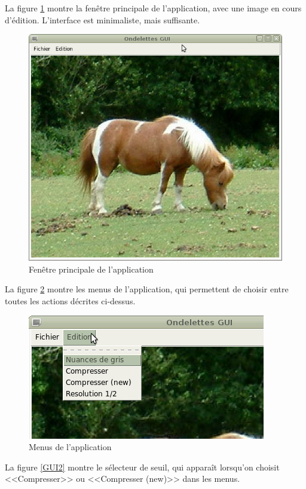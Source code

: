 \documentclass{article}
\begin{document}
La figure \ref{GUI} montre la fenêtre principale de l'application, avec une image en cours d'édition. L'interface est minimaliste, mais suffisante.


\begin{figure}[!hb]
\centering
\includegraphics[scale=0.5]{images/OndelettesGUI.png}
\caption{Fenêtre principale de l'application}
\label{GUI}
\end{figure}


La figure \ref{GUI1} montre les menus de l'application, qui permettent de choisir entre toutes les actions décrites ci-dessus.

\begin{figure}[!ht]
\centering
\includegraphics[scale=0.8]{images/OndelettesGUI1.png}
\caption{Menus de l'application}
\label{GUI1}
\end{figure}

La figure \ref{GUI2} montre le sélecteur de seuil, qui apparaît lorsqu'on choisit <<Compresser>> ou <<Compresser (new)>> dans les menus.
\end{document}
